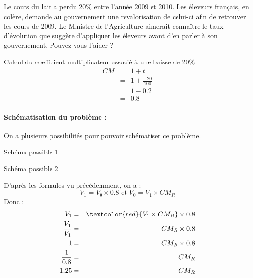 \begin{ex}{}{}
Le cours du lait a perdu $20\%$ entre l'année 2009 et 2010. Les éleveurs français, en colère, demande au gouvernement une revalorisation de celui-ci afin de retrouver les cours de 2009. Le Ministre de l'Agriculture aimerait connaître le taux d'évolution que suggère d'appliquer les éleveurs avant d'en parler à son gouvernement.
Pouvez-vous l'aider ?
\bigbreak

Calcul du coefficient multiplicateur associé à une baisse de $20\%$
\begin{eqnarray*}
CM &=& 1 + t \\
&=& 1 + \frac{-20}{100} \\
&=& 1 - 0.2 \\
&=& 0.8
\end{eqnarray*}

\paragraph{Schématisation du problème :}
On a plusieurs possibilités pour pouvoir schématiser ce problème.
\begin{center}
\end{center}
\begin{center}
Schéma possible 1
\end{center}
\begin{center}
\end{center}
\begin{center}
Schéma possible 2
\end{center}

D'après les formules vu précédemment, on a :
\[V_{1} = V_{0}\times 0.8 \text{ et }V_{0} = V_{1}\times CM_{R}\]
Donc :
\begin{eqnarray*}
V_{1} &=& \textcolor{red}{V_{1}\times CM_{R}}\times 0.8\\
\frac{V_{1}}{V_{1}} &=& CM_{R}\times 0.8\\
1 &=& CM_{R}\times 0.8\\
\frac{1}{0.8} &=& CM_{R}\\
1.25 &=& CM_{R}
\end{eqnarray*}


\end{ex}
